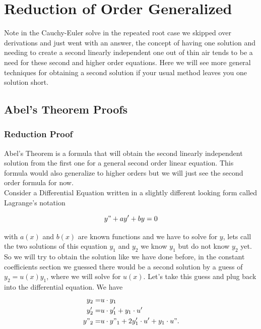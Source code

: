 \documentclass[12pt]{article}
\begin{document}
\pagebreak

\section{Reduction of Order Generalized} 

Note in the Cauchy-Euler solve in the repeated root case we skipped over derivations and just went with an answer, the concept of having one solution and needing to create a second linearly independent one out of thin air tends to be a need for these second and higher order equations. Here we will see more general techniques for obtaining a second solution if your usual method leaves you one solution short.

\subsection{Abel's Theorem Proofs}

\subsubsection{Reduction Proof}

Abel's Theorem is a formula that will obtain the second linearly independent solution from the first one for a general second order linear equation. This formula would also generalize to higher orders but we will just see the second order formula for now. \\

Consider a Differential Equation written in a slightly different looking form called Lagrange's notation

\begin{equation*}
    y"+ay'+by=0
\end{equation*}

with $a(x)$ and $b(x)$ are known functions and we have to solve for $y$, lets call the two solutions of this equation $y_1$ and $y_2$ we know $y_1$ but do not know $y_2$ yet. So we will try to obtain the solution like we have done before, in the constant coefficients section we guessed there would be a second solution by a guess of $y_2=u(x)y_1$, where we will solve for $u(x)$. Let's take this guess and plug back into the differential equation. We have 
\begin{align*}
   y_2 =& u\cdot y_1 \\
   y'_2 =& u \cdot y'_1 + y_1 \cdot u' \\
   y"_2 =& u \cdot y"_1 + 2y'_1\cdot u' + y_1 \cdot u".
\end{align*}
\end{document}
